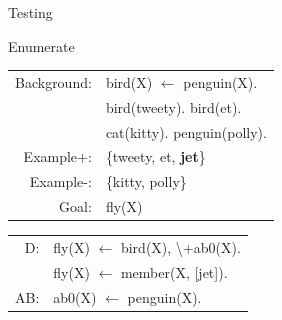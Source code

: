 \documentclass[12pt,a4paper]{article}
\begin{document}
\begin{section}{Testing}
		\begin{subsection}{Enumerate}
			\begin{multicols}{2}
			 \vspace{-1em}
				\begin{table}[H]
					\begin{tabular}{rl}
					Background: & bird(X) $\leftarrow$ penguin(X). \\
					            & bird(tweety). bird(et).                       \\
					            & cat(kitty). penguin(polly).                   \\
					Example+:   & \{tweety, et, {\bf jet}\}                     \\
					Example-:   & \{kitty, polly\}                              \\
					Goal:       & fly(X)                                      
					\end{tabular}
				\end{table}
				\columnbreak
				 \vspace{-1em}
				\begin{table}[H]
					\begin{tabular}{rl}
					D: & fly(X) $\leftarrow$ bird(X), \textbackslash{+ab0(X)}. \\
					   & fly(X) $\leftarrow$ member(X, [jet]). \\
					AB:& ab0(X) $\leftarrow$ penguin(X).\\
					\end{tabular}
				\end{table}
			\end{multicols}
		\end{subsection}


\end{section}
\end{document}
